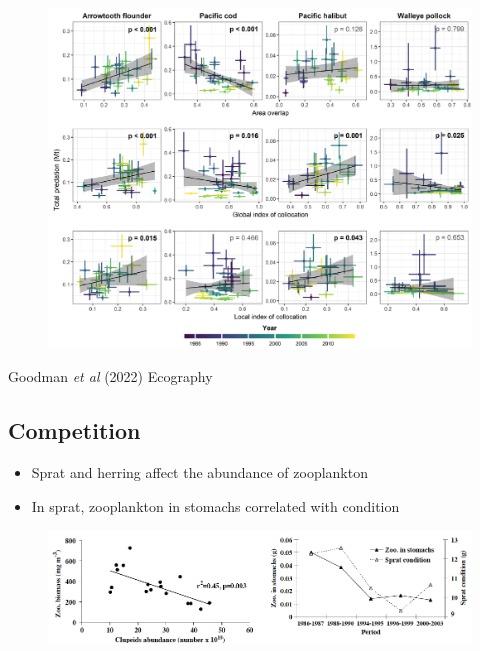 \documentclass[
  letterpaper,
  DIV=11,
  numbers=noendperiod]{scrartcl}
\begin{document}
\begin{figure}

{\centering \includegraphics{images/goodman3.png}

}

\end{figure}

Goodman \emph{et al} (2022) Ecography

\hypertarget{competition-1}{%
\subsection{Competition}\label{competition-1}}

\begin{itemize}
\item
  Sprat and herring affect the abundance of zooplankton
\item
  In sprat, zooplankton in stomachs correlated with condition
\end{itemize}

\begin{figure}

{\centering \includegraphics{images/casini_sprat.png}

}

\end{figure}
\end{document}
